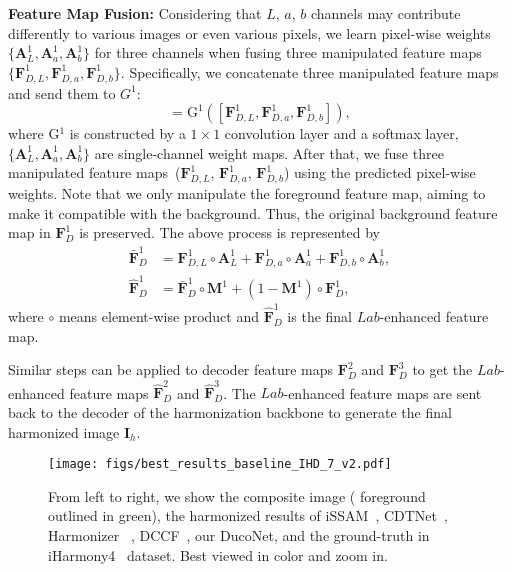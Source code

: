 \documentclass[sigconf]{acmart}
\begin{document}
\noindent\textbf{Feature Map Fusion: } Considering that $L$, $a$, $b$ channels may contribute differently to various images or even various pixels, we learn pixel-wise weights $\{\bm{A}_{\textit{L}}^{1}, \bm{A}_{\textit{a}}^{1}, \bm{A}_{\textit{b}}^{1}\}$ for three channels when fusing three manipulated feature maps $\{\bm{F}_{D, \textit{L}}^{1}, \bm{F}_{D, \textit{a}}^{1}, \bm{F}_{D, \textit{b}}^{1}\}$. Specifically, we concatenate three manipulated feature maps and send them to $G^1$:
\begin{equation}
    [\bm{A}_{\textit{L}}^{1}, \bm{A}_{\textit{a}}^{1}, \bm{A}_{\textit{b}}^{1}] = \text{G}^{1}\left([\bm{F}_{D, \textit{L}}^{1}, \bm{F}_{D, \textit{a}}^{1}, \bm{F}_{D, \textit{b}}^{1}]\right),
\end{equation}
where G$^{1}$ is constructed by a $1 \times 1$ convolution layer and a softmax layer, $\{\bm{A}_{\textit{L}}^{1}, \bm{A}_{\textit{a}}^{1}, \bm{A}_{\textit{b}}^{1}\}$ are single-channel weight maps. After that, we fuse three manipulated feature maps~($\bm{F}_{D, \textit{L}}^{1}$, $\bm{F}_{D, \textit{a}}^{1}$, $\bm{F}_{D, \textit{b}}^{1}$) using the predicted pixel-wise weights. Note that we only manipulate the foreground feature map, aiming to make it compatible with the background. Thus, the original background feature map in $\bm{F}_{D}^{1}$ is preserved. The above process is represented by
\begin{equation}\label{equation_4}
    \begin{aligned}
    \bm{\bar{F}}_{D}^{1} &= \bm{F}_{D, \textit{L}}^{1} \circ \bm{A}_{\textit{L}}^{1} + \bm{F}_{D, \textit{a}}^{1} \circ \bm{A}_{\textit{a}}^{1} + \bm{F}_{D, \textit{b}}^{1} \circ \bm{A}_{\textit{b}}^{1}, \\
    \bm{\hat{F}}_{D}^{1} &= \bm{\bar{F}}_{D}^{1} \circ \bm{M}^{1} + (1-\bm{M}^{1}) \circ \bm{F}_{D}^{1}, 
    \end{aligned}
\end{equation}
where $\circ$ means element-wise product and $\bm{\hat{F}}_{D}^{1}$ is the final $Lab$-enhanced feature map. 

Similar steps can be applied to decoder feature maps $\bm{F}_{D}^{2}$ and $\bm{F}_{D}^{3}$ to get the $Lab$-enhanced feature maps $\bm{\hat{F}}_{D}^{2}$ and $\bm{\hat{F}}_{D}^{3}$. The $Lab$-enhanced feature maps are sent back to the decoder of the harmonization backbone to generate the final harmonized image $\bm{I}_{h}$.


\begin{figure*}[htbp]
  \centering
  \texttt{[image: figs/best\_results\_baseline\_IHD\_7\_v2.pdf]}
  \caption{From left to right, we show the composite image ( foreground outlined  in green), the harmonized results of iSSAM~\cite{issam}, CDTNet~\cite{CDTNet}, Harmonizer ~\cite{harmonizer}, DCCF~\cite{DCCF}, our DucoNet, and the ground-truth in iHarmony4~\cite{dovenet} dataset. Best viewed in color and zoom in.}
  \Description{}
  \label{fig:baseline_IHD}
\end{figure*}
\end{document}
